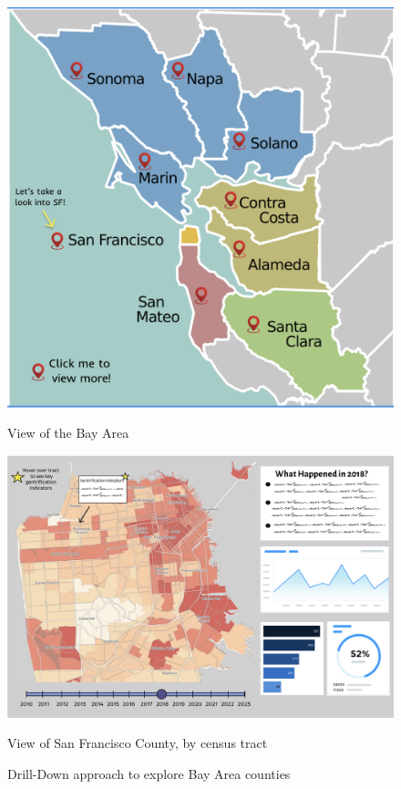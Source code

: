 \graphicspath{{../imgs/}}

\begin{figure}[h!]
    \centering
    \begin{minipage}{0.48\textwidth}
        \centering
        \includegraphics[width=\linewidth]{fig1.png}
        \caption{View of the Bay Area}
        \label{fig:first}
    \end{minipage}\hfill 
    \begin{minipage}{0.48\textwidth}
        \centering
        \includegraphics[width=\linewidth]{fig2.png}
        \caption{View of San Francisco County, by census tract}
        \label{fig:second}
    \end{minipage}
    \caption{Drill-Down approach to explore Bay Area counties}
    \label{fig:combined}
\end{figure}